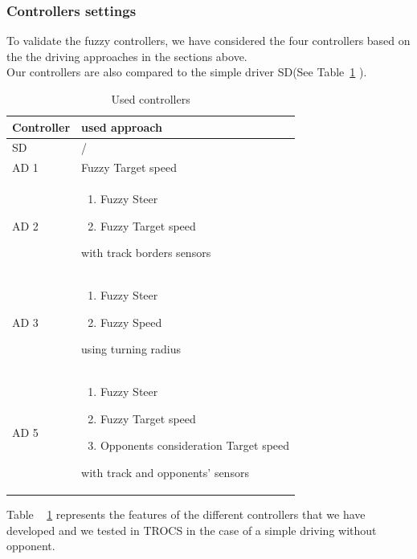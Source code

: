 \documentclass{llncs}
\begin{document}
\subsubsection{Controllers settings}
To validate the fuzzy controllers, we have considered the four controllers based on the the driving approaches in the sections above.\\
Our controllers are also compared to the simple driver SD(See Table~\ref{control} ).
\begin{table}[h!]
	
	\caption{Used controllers}
	\label{control}
	\begin{tabular}{ |p{2cm}|p{5.5 cm}|}
		\hline
		\color{red}\textbf{Controller}&  
		{ \color{red} \textbf{used approach} } 
		\\
		\hline
		SD & /\\
		\hline
		
		AD 1 &  Fuzzy Target speed \\
		\hline
		AD 2& \begin{enumerate}
			\item Fuzzy Steer 
			\item Fuzzy Target speed 
		\end{enumerate}  
		with track borders sensors
		\\
		\hline
		AD 3&  \begin{enumerate}
			\item Fuzzy Steer
			\item Fuzzy Speed
			
		\end{enumerate}
		using turning radius
		\\
		\hline
		
		\hline
		AD 5& \begin{enumerate}
			\item Fuzzy Steer 
			\item Fuzzy Target speed 
			\item Opponents consideration Target speed 
		\end{enumerate}  
		with track and opponents' sensors\\
		\hline
	\end{tabular} 
\end{table}



Table ~ \ref{control} represents the features of the different controllers that we have developed and we tested  in TROCS in the case of a simple driving without opponent.\\
\end{document}

